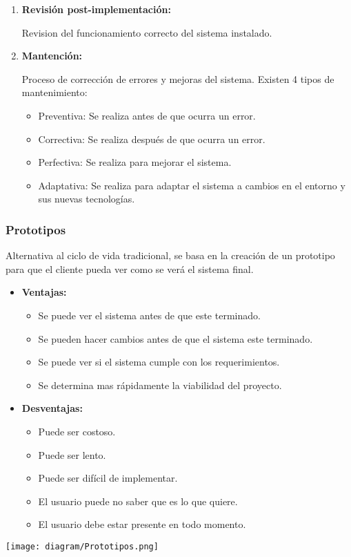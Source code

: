 \documentclass{templateNote}
\begin{document}
\begin{enumerate}
    \item \hypertarget{RPI}{\textbf{Revisión post-implementación:}} Revision del funcionamiento correcto del sistema instalado.
    
    \item \hypertarget{M}{\textbf{Mantención:}} Proceso de corrección de errores y mejoras del sistema. Existen 4 tipos de mantenimiento:
    \begin{itemize}
        \item Preventiva: Se realiza antes de que ocurra un error.
        \item Correctiva: Se realiza después de que ocurra un error.
        \item Perfectiva: Se realiza para mejorar el sistema.
        \item Adaptativa: Se realiza para adaptar el sistema a cambios en el entorno y sus nuevas tecnologías.
    \end{itemize}
\end{enumerate}

\newpage
\subsubsection*{Prototipos}
\noindent Alternativa al ciclo de vida tradicional, se basa en la creación de un prototipo para que el cliente pueda ver como se verá el sistema final.
\begin{itemize}
    \item \textbf{Ventajas:}
    \begin{itemize}
        \item Se puede ver el sistema antes de que este terminado.
        \item Se pueden hacer cambios antes de que el sistema este terminado.
        \item Se puede ver si el sistema cumple con los requerimientos.
        \item Se determina mas rápidamente la viabilidad del proyecto.
    \end{itemize}
    \item \textbf{Desventajas:}
    \begin{itemize}
        \item Puede ser costoso.
        \item Puede ser lento.
        \item Puede ser difícil de implementar.
        \item El usuario puede no saber que es lo que quiere.
        \item El usuario debe estar presente en todo momento.
    \end{itemize}
\end{itemize}
\begin{center}
    \texttt{[image: diagram/Prototipos.png]}
\end{center}
\end{document}
